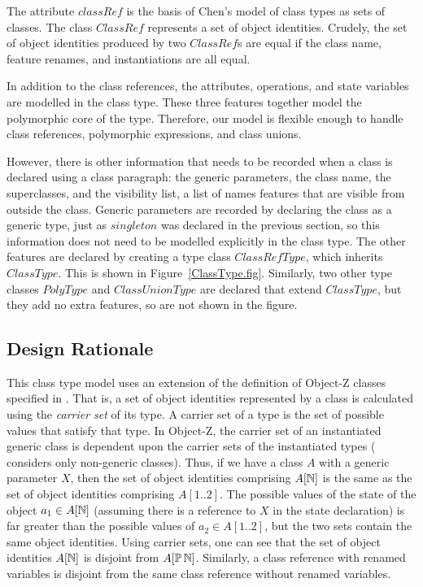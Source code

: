 The attribute $classRef$ is the basis of Chen's model of class types
as sets of classes. The class $ClassRef$ represents a set of object
identities. Crudely, the set of object identities produced by two
$ClassRef$s are equal if the class name, feature renames, and
instantiations are all equal.

In addition to the class references, the attributes, operations, and
state variables are modelled in the class type. These three features
together model the polymorphic core of the type. Therefore, our model
is flexible enough to handle class references, polymorphic
expressions, and class unions.

However, there is other information that needs to be recorded when a
class is declared using a class paragraph: the generic parameters, the
class name, the superclasses, and the visibility list, a list of names
features that are visible from outside the class. Generic parameters
are recorded by declaring the class as a generic type, just as
$singleton$ was declared in the previous section, so this information
does not need to be modelled explicitly in the class type. The other
features are declared by creating a type class $ClassRefType$, which
inherits $ClassType$. This is shown in
Figure~\ref{ClassType.fig}. Similarly, two other type classes
$PolyType$ and $ClassUnionType$ are declared that extend $ClassType$,
but they add no extra features, so are not shown in the figure.

\subsection{Design Rationale}

This class type model uses an extension of the definition of Object-Z
classes specified in \cite{griffiths94}. That is, a set of object
identities represented by a class is calculated using the {\em carrier
set} of its type. A carrier set of a type is the set of possible
values that satisfy that type. In Object-Z, the carrier set of an
instantiated generic class is dependent upon the carrier sets of the
instantiated types (\cite{griffiths94} considers only non-generic
classes). Thus, if we have a class $A$ with a generic parameter $X$,
then the set of object identities comprising $A[{\mathbb N}]$ is the same as
the set of object identities comprising $A[1..2]$. The possible values
of the state of the object $a_1 \in A[{\mathbb N}]$ (assuming there is a
reference to $X$ in the state declaration) is far greater than the
possible values of $a_2 \in A[1..2]$, but the two sets contain the
same object identities. Using carrier sets, one can see that the set
of object identities $A[{\mathbb N}]$ is disjoint from $A[\power
\nat]$. Similarly, a class reference with renamed variables is
disjoint from the same class reference without renamed variables.

